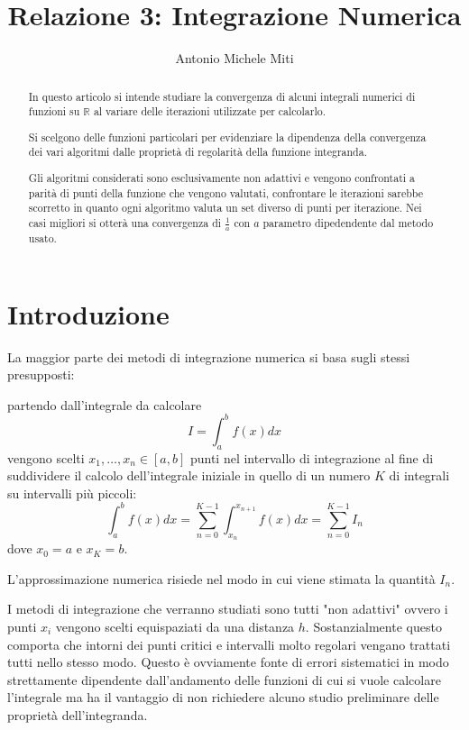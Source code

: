 \documentclass{article}
\title{Relazione 3: Integrazione Numerica}
\author{Antonio Michele Miti}
\begin{document}
\maketitle
\begin{abstract}
In questo articolo si intende studiare la convergenza di alcuni integrali numerici di funzioni su $\mathbb{R}$ al variare delle iterazioni utilizzate per calcolarlo. 

Si scelgono delle funzioni particolari per evidenziare la dipendenza della convergenza dei vari algoritmi dalle proprietà di regolarità della funzione integranda.

Gli algoritmi considerati sono esclusivamente non adattivi e vengono confrontati a parità di punti della funzione che vengono valutati, confrontare le iterazioni sarebbe scorretto in quanto ogni algoritmo valuta un set diverso di punti per iterazione.
Nei casi migliori si otterà una convergenza di $\frac{1}{a}$ con $a$ parametro dipedendente dal metodo usato.
\end{abstract}


\section{Introduzione}

La maggior parte dei metodi di integrazione numerica si basa sugli stessi presupposti:  

partendo dall'integrale da calcolare $$I = \int_{a}^{b}f(x)dx$$ vengono scelti $x_{1},\ldots,x_{n}\in [a,b]$ punti nel intervallo di integrazione al fine di suddividere il calcolo dell'integrale iniziale in quello di un numero $K$ di integrali su intervalli più piccoli: 
	\begin{equation}
	\int_{a}^{b}f(x)dx= \sum_{n=0}^{K-1}\int_{x_{n}}^{x_{n+1}}f(x)dx = \sum_{n=0}^{K-1}I_{n}
	\end{equation}
dove $x_{0}=a$ e $x_{K}=b$.

L'approssimazione numerica risiede nel modo in cui viene stimata la quantità $I_{n}$.

I metodi di integrazione che verranno studiati sono tutti "non adattivi" ovvero i punti $x_{i}$ vengono scelti equispaziati da una distanza $h$. Sostanzialmente questo comporta che intorni dei punti critici e intervalli molto regolari vengano trattati tutti nello stesso modo.
Questo è ovviamente fonte di errori sistematici in modo strettamente dipendente dall'andamento delle funzioni di cui si vuole calcolare l'integrale ma ha il vantaggio di non richiedere alcuno studio preliminare delle proprietà dell'integranda.
\end{document}
